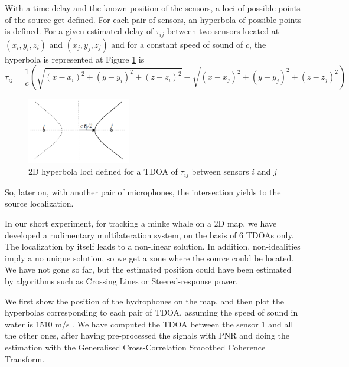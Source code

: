 With a time delay and the known position of the sensors, a loci of possible points of the source get defined. For each pair of sensors, an hyperbola of possible points is defined. For a given estimated delay of $\tau_{ij}$ between two sensors located at $(x_i,y_i,z_i)$ and $(x_j,y_j,z_j)$ and for a constant speed of sound of $c$, the hyperbola is represented at Figure \ref{fig:hyp} is
\begin{dmath}
  \tau_{ij} = \frac{1}{c}\left(\sqrt{(x-x_i)^2 + (y-y_i)^2 + (z-z_i)^2} - 
  \sqrt{(x-x_j)^2 + (y-y_j)^2 + (z-z_j)^2} \right)
\end{dmath}

\begin{figure}[htb]
	\begin{center}
		\includegraphics[width=0.4\textwidth]{figures/tdoa.png}
	\end{center}
	\caption{2D hyperbola loci defined for a TDOA of $\tau_{ij}$ between sensors $i$ and $j$}
	\label{fig:hyp}
\end{figure}

So, later on, with another pair of microphones, the intersection yields to the source localization.

In our short experiment, for tracking a minke whale on a 2D map, we have developed a rudimentary multilateration system, on the basis of 6 TDOAs only. The localization by itself leads to a non-linear solution. In addition, non-idealities imply a no unique solution, so we get a zone where the source could be located. We have not gone so far, but the estimated position could have been estimated by algorithms such as Crossing Lines or Steered-response power.

We first show the position of the hydrophones on the map, and then plot the hyperbolas corresponding to each pair of TDOA, assuming the speed of sound in water is 1510 m/s \cite{speed-sound-seawater}.  We have computed the TDOA between the sensor 1 and all the other ones, after having pre-processed the signals with PNR and doing the estimation with the Generalised Cross-Correlation Smoothed Coherence Transform. 

